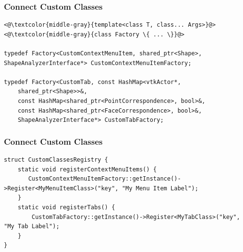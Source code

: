 \documentclass[compress]{beamer}
\begin{document}
\begin{frame}[fragile]
\frametitle{Connect Custom Classes}

\begin{lstlisting}
<@\textcolor{middle-gray}{template<class T, class... Args>}@>
<@\textcolor{middle-gray}{class Factory \{ ... \}}@>

typedef Factory<CustomContextMenuItem, shared_ptr<Shape>, ShapeAnalyzerInterface*> CustomContextMenuItemFactory;

typedef Factory<CustomTab, const HashMap<vtkActor*,
    shared_ptr<Shape>>&,
    const HashMap<shared_ptr<PointCorrespondence>, bool>&,
    const HashMap<shared_ptr<FaceCorrespondence>, bool>&,
    ShapeAnalyzerInterface*> CustomTabFactory;
\end{lstlisting}

\end{frame}

\begin{frame}[fragile]
\frametitle{Connect Custom Classes}

\begin{lstlisting}
struct CustomClassesRegistry {
    static void registerContextMenuItems() {
       CustomContextMenuItemFactory::getInstance()->Register<MyMenuItemClass>("key", "My Menu Item Label");
    }
    static void registerTabs() {
        CustomTabFactory::getInstance()->Register<MyTabClass>("key", "My Tab Label");
    }
}
\end{lstlisting}
  
\end{frame}
\end{document}
